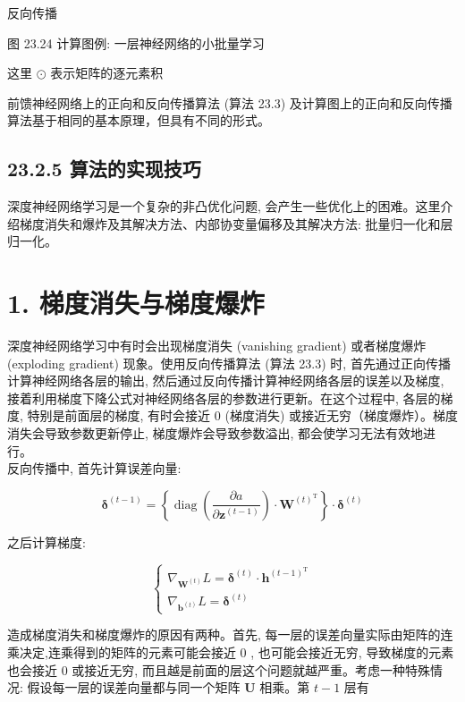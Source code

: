 \documentclass[10pt]{article}
\begin{document}
\begin{CJK*}{UTF8}{bsmi}
反向传播

图 23.24 计算图例: 一层神经网络的小批量学习

这里 $\odot$ 表示矩阵的逐元素积

前馈神经网络上的正向和反向传播算法 (算法 23.3) 及计算图上的正向和反向传播算法基于相同的基本原理，但具有不同的形式。

\subsection*{23.2.5 算法的实现技巧}
深度神经网络学习是一个复杂的非凸优化问题, 会产生一些优化上的困难。这里介绍梯度消失和爆炸及其解决方法、内部协变量偏移及其解决方法: 批量归一化和层归一化。

\section*{1. 梯度消失与梯度爆炸}
深度神经网络学习中有时会出现梯度消失 (vanishing gradient) 或者梯度爆炸 (exploding gradient) 现象。使用反向传播算法 (算法 23.3) 时, 首先通过正向传播计算神经网络各层的输出, 然后通过反向传播计算神经网络各层的误差以及梯度, 接着利用梯度下降公式对神经网络各层的参数进行更新。在这个过程中, 各层的梯度, 特别是前面层的梯度, 有时会接近 0 (梯度消失) 或接近无穷（梯度爆炸）。梯度消失会导致参数更新停止, 梯度爆炸会导致参数溢出, 都会使学习无法有效地进行。\\
反向传播中, 首先计算误差向量:


\begin{equation*}
\boldsymbol{\delta}^{(t-1)}=\left\{\operatorname{diag}\left(\frac{\partial a}{\partial \boldsymbol{z}^{(t-1)}}\right) \cdot \boldsymbol{W}^{(t)^{\mathrm{T}}}\right\} \cdot \boldsymbol{\delta}^{(t)} \tag{23.57}
\end{equation*}


之后计算梯度:

\[
\left\{\begin{array}{c}
\nabla_{\boldsymbol{W}^{(t)}} L=\boldsymbol{\delta}^{(t)} \cdot \boldsymbol{h}^{(t-1)^{\mathrm{T}}}  \tag{23.58}\\
\nabla_{\boldsymbol{b}^{(t)}} L=\boldsymbol{\delta}^{(t)}
\end{array}\right.
\]

造成梯度消失和梯度爆炸的原因有两种。首先, 每一层的误差向量实际由矩阵的连乘决定,连乘得到的矩阵的元素可能会接近 0 , 也可能会接近无穷, 导致梯度的元素也会接近 0 或接近无穷, 而且越是前面的层这个问题就越严重。考虑一种特殊情况: 假设每一层的误差向量都与同一个矩阵 $\boldsymbol{U}$ 相乘。第 $t-1$ 层有


\end{CJK*}
\end{document}
